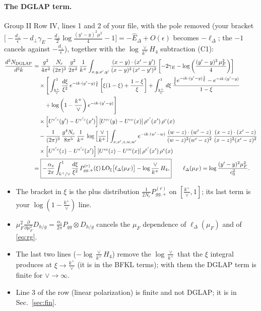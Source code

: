 \documentclass[9pt]{article}
\numberwithin{equation}{section}
\begin{document}
\paragraph{The DGLAP term.} Group II Row IV, lines 1 and 2 of your file, with the pole removed (your bracket $\big[-\frac{d_\perp}{\epsilon}-d_\perp\gamma_E-\frac{d_\perp}{2}\log\frac{(y'-y)^2\mu^2}{4}-1\big]=-\hat E_\Delta+O(\epsilon)$ becomes $-\ell_\Delta$; the $-1$ cancels against $-\frac{d_\perp}{\epsilon}$), together with the $\log\frac{\vee}{k^+}H_4$ subtraction (C1):
\begin{align}
\frac{d^{3}N_{\rm DGLAP}}{d^{3}k}&=\frac{g^{2}}{4\pi^{2}}\,\frac{N_{c}}{(2\pi)^{3}}\,\frac{g^{2}}{2\pi^{2}}\,\frac{1}{k^{+}}\int_{x,y,x',y'}\frac{(x-y)\cdot(x'-y')}{(x-y)^{2}\,(x'-y')^{2}}\left[-2\gamma_{E}-\log\left(\frac{(y'-y)^{2}\,\mu_{F}^{2}}{4}\right)\right]\notag\\
&\quad\times\Bigg[\int_{\frac{k^{+}}{\vee}}^{1}\frac{d\xi}{\xi^{2}}\,e^{-ik\cdot(y'-y)\frac{1}{\xi}}\left[\xi(1-\xi)+\frac{1-\xi}{\xi}\right]+\int_{\frac{k^{+}}{\vee}}^{1}d\xi\,\frac{\frac{1}{\xi}e^{-ik\cdot(y'-y)\frac{1}{\xi}}-e^{-ik\cdot(y'-y)}}{1-\xi}\notag\\
&\qquad+\log\left(1-\frac{k^{+}}{\vee}\right)e^{-ik\cdot(y'-y)}\Bigg]\notag\\
&\quad\times\left[U^{e'c}(y')-U^{e'c}(x')\right]\left[U^{ec}(y)-U^{ce}(x)\right]\rho^{e'}(x')\,\rho^{e}(x)\notag\\
&\quad-\frac{1}{(2\pi)^{3}}\,\frac{g^{4}N_{c}}{8\pi^{5}}\,\frac{1}{k^{+}}\,\log{\left[\frac{\vee}{k^{+}}\right]}\int_{x,x',z,w,w'}e^{-ik\cdot(w'-w)}\,\frac{(w-z)\cdot(w'-z)}{(w-z)^{2}(w'-z)^{2}}\,\frac{(x-z)\cdot(x'-z)}{(x-z)^{2}(x'-z)^{2}}\notag\\
&\quad\times\left[U^{e'c}(z)-U^{e'c}(x')\right]\left[U^{ec}(z)-U^{ce}(x)\right]\rho^{e'}(x')\,\rho^{e}(x)\notag\\
&=\boxed{-\frac{\alpha_s}{2\pi}\int_{k^+/\vee}^{1}\frac{d\xi}{\xi^{2}}\,P^{(r)}_{gg,+}(\xi)\,{\rm LO}_\xi\big[\ell_\Delta(\mu_F)\big]-\log\frac{\vee}{k^+}\,H_4,}\qquad \ell_\Delta(\mu_F)=\log\frac{(y'-y)^2\mu_F^2}{c_0^2}.
\label{eq:dglap}
\end{align}
\begin{itemize}
\item The bracket in $\xi$ is the plus distribution $\frac{1}{2N_c}P^{(r)}_{gg,+}$ on $[\frac{k^+}{\vee},1]$; its last term is your $\log(1-\frac{k^+}{\vee})$ line.
\item $\mu_F^2\frac{\partial}{\partial\mu_F^2}D_{h/g}=\frac{\alpha_s}{2\pi}P_{gg}\otimes D_{h/g}$ cancels the $\mu_F$ dependence of $\ell_\Delta(\mu_F)$ and of \eqref{eq:rg}.
\item The last two lines ($-\log\frac{\vee}{k^+}H_4$) remove the $\log\frac{\vee}{k^+}$ that the $\xi$ integral produces at $\xi\to\frac{k^+}{\vee}$ (it is in the BFKL terms); with them the DGLAP term is finite for $\vee\to\infty$.
\item Line 3 of the row (linear polarization) is finite and not DGLAP; it is in Sec.~\ref{sec:fin}.
\end{itemize}
\end{document}
